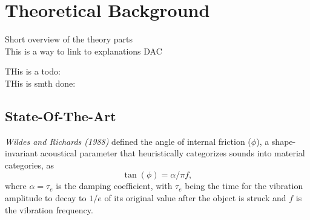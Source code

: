 \chapter{Theoretical Background}\label{ch:theory}
Short overview of the theory parts\\

This is a way to link to explanations \gls{DAC} 

THis is a todo: 
\\
THis is smth done:
\done{}

\section{State-Of-The-Art}\label{sec:state_art}
\textit{Wildes and Richards (1988)} defined the angle of internal friction ($\phi$), a shape-invariant acoustical parameter that heuristically categorizes sounds into material categories, as
\begin{equation}\label{eq:tanf}
\tan(\phi) = \alpha / \pi f,
\end{equation}
where $\alpha = \tau_e$ is the damping coefficient, with $\tau_e$ being the time for the vibration amplitude to decay to $1/e$ of its original value after the object is struck  and $f$ is the vibration frequency\cite{giordano2006material}.

